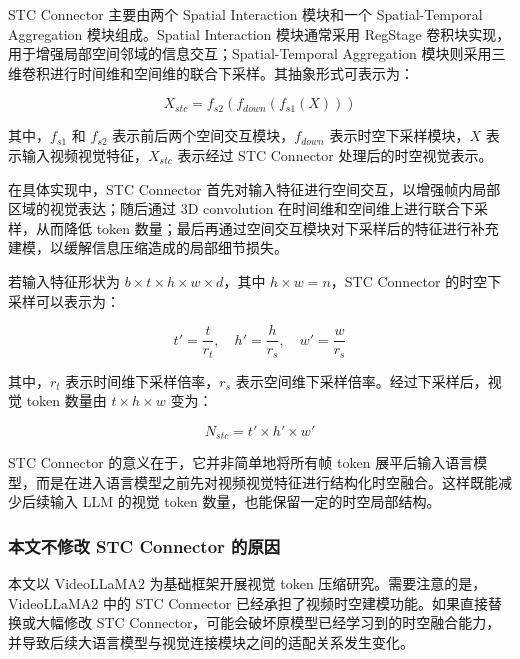 STC Connector 主要由两个 Spatial Interaction 模块和一个 Spatial-Temporal Aggregation 模块组成。Spatial Interaction 模块通常采用 RegStage 卷积块实现，用于增强局部空间邻域的信息交互；Spatial-Temporal Aggregation 模块则采用三维卷积进行时间维和空间维的联合下采样。其抽象形式可表示为：

\begin{equation}
    \label{equ:stc_connector}
    X_{stc}=f_{s2}(f_{down}(f_{s1}(X)))
\end{equation}

其中，$f_{s1}$ 和 $f_{s2}$ 表示前后两个空间交互模块，$f_{down}$ 表示时空下采样模块，$X$ 表示输入视频视觉特征，$X_{stc}$ 表示经过 STC Connector 处理后的时空视觉表示。

在具体实现中，STC Connector 首先对输入特征进行空间交互，以增强帧内局部区域的视觉表达；随后通过 3D convolution 在时间维和空间维上进行联合下采样，从而降低 token 数量；最后再通过空间交互模块对下采样后的特征进行补充建模，以缓解信息压缩造成的局部细节损失。

若输入特征形状为 $b\times t\times h\times w\times d$，其中 $h\times w=n$，STC Connector 的时空下采样可以表示为：

\begin{equation}
    \label{equ:stc_downsample}
    t'=\frac{t}{r_t},\quad h'=\frac{h}{r_s},\quad w'=\frac{w}{r_s}
\end{equation}

其中，$r_t$ 表示时间维下采样倍率，$r_s$ 表示空间维下采样倍率。经过下采样后，视觉 token 数量由 $t\times h\times w$ 变为：

\begin{equation}
    \label{equ:stc_token_number}
    N_{stc}=t'\times h'\times w'
\end{equation}

STC Connector 的意义在于，它并非简单地将所有帧 token 展平后输入语言模型，而是在进入语言模型之前先对视频视觉特征进行结构化时空融合。这样既能减少后续输入 LLM 的视觉 token 数量，也能保留一定的时空局部结构。

\subsubsection{本文不修改 STC Connector 的原因}

本文以 VideoLLaMA2 为基础框架开展视觉 token 压缩研究。需要注意的是，VideoLLaMA2 中的 STC Connector 已经承担了视频时空建模功能。如果直接替换或大幅修改 STC Connector，可能会破坏原模型已经学习到的时空融合能力，并导致后续大语言模型与视觉连接模块之间的适配关系发生变化。

